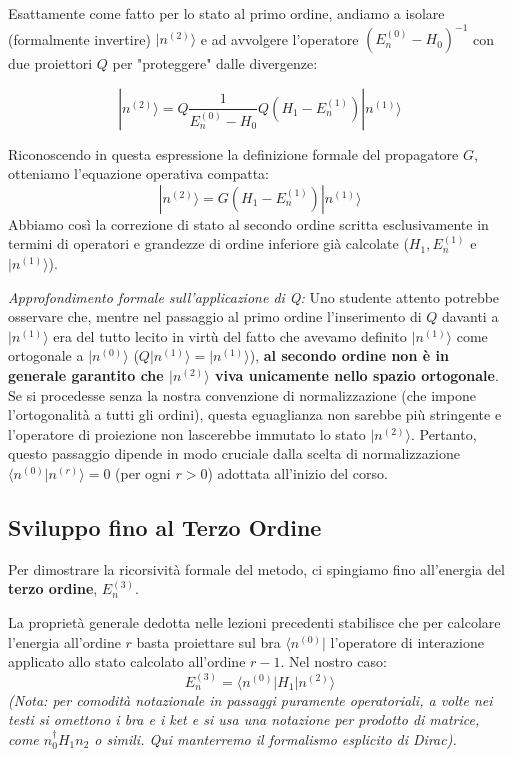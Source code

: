 Esattamente come fatto per lo stato al primo ordine, andiamo a isolare (formalmente invertire) $\vert{}n^{(2)}\rangle$ e ad avvolgere l'operatore $(E_n^{(0)} - H_0)^{-1}$ con due proiettori $Q$ per "proteggere" dalle divergenze:

\begin{equation}
|n^{(2)}\rangle = Q \frac{1}{E_n^{(0)} - H_0} Q (H_1 - E_n^{(1)}) |n^{(1)}\rangle
\end{equation}

Riconoscendo in questa espressione la definizione formale del propagatore $G$, otteniamo l'equazione operativa compatta:
\begin{equation}
|n^{(2)}\rangle = G (H_1 - E_n^{(1)}) |n^{(1)}\rangle
\end{equation}
Abbiamo così la correzione di stato al secondo ordine scritta esclusivamente in termini di operatori e grandezze di ordine inferiore già calcolate ($H_1, E_n^{(1)}$ e $\vert{}n^{(1)}\rangle$).

\textit{Approfondimento formale sull'applicazione di Q:} Uno studente attento potrebbe osservare che, mentre nel passaggio al primo ordine l'inserimento di $Q$ davanti a $\vert{}n^{(1)}\rangle$ era del tutto lecito in virtù del fatto che avevamo definito $\vert{}n^{(1)}\rangle$ come ortogonale a $\vert{}n^{(0)}\rangle$ ($Q\vert{}n^{(1)}\rangle = \vert{}n^{(1)}\rangle$), \textbf{al secondo ordine non è in generale garantito che $\vert{}n^{(2)}\rangle$ viva unicamente nello spazio ortogonale}. Se si procedesse senza la nostra convenzione di normalizzazione (che impone l'ortogonalità a tutti gli ordini), questa eguaglianza non sarebbe più stringente e l'operatore di proiezione non lascerebbe immutato lo stato $\vert{}n^{(2)}\rangle$. Pertanto, questo passaggio dipende in modo cruciale dalla scelta di normalizzazione $\langle n^{(0)} \vert{} n^{(r)} \rangle = 0$ (per ogni $r>0$) adottata all'inizio del corso.

\subsection{Sviluppo fino al Terzo Ordine}

Per dimostrare la ricorsività formale del metodo, ci spingiamo fino all'energia del \textbf{terzo ordine}, $E_n^{(3)}$.

La proprietà generale dedotta nelle lezioni precedenti stabilisce che per calcolare l'energia all'ordine $r$ basta proiettare sul bra $\langle n^{(0)} \vert{}$ l'operatore di interazione applicato allo stato calcolato all'ordine $r-1$. Nel nostro caso:
\begin{equation}
E_n^{(3)} = \langle n^{(0)} | H_1 | n^{(2)} \rangle
\end{equation}
\textit{(Nota: per comodità notazionale in passaggi puramente operatoriali, a volte nei testi si omettono i bra e i ket e si usa una notazione per prodotto di matrice, come $n_0^\dagger H_1 n_2$ o simili. Qui manterremo il formalismo esplicito di Dirac).}

